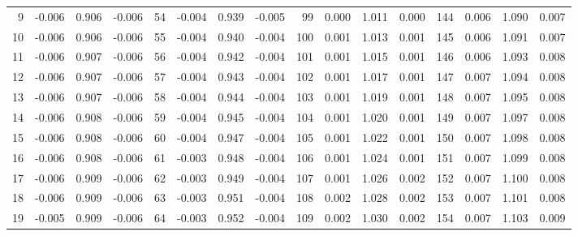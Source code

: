 \begin{table}
{\begin{tabular}{rrrr|rrrr|rrrr|crrr}
  9 & \tiny{ -0.006} &   0.906 & \tiny{ -0.006} &  54 & \tiny{ -0.004} &   0.939 & \tiny{ -0.005} &  99 & \tiny{  0.000} &   1.011 & \tiny{  0.000} & 144 & \tiny{  0.006} &   1.090 & \tiny{  0.007}\\
 10 & \tiny{ -0.006} &   0.906 & \tiny{ -0.006} &  55 & \tiny{ -0.004} &   0.940 & \tiny{ -0.004} & 100 & \tiny{  0.001} &   1.013 & \tiny{  0.001} & 145 & \tiny{  0.006} &   1.091 & \tiny{  0.007}\\
 11 & \tiny{ -0.006} &   0.907 & \tiny{ -0.006} &  56 & \tiny{ -0.004} &   0.942 & \tiny{ -0.004} & 101 & \tiny{  0.001} &   1.015 & \tiny{  0.001} & 146 & \tiny{  0.006} &   1.093 & \tiny{  0.008}\\
 12 & \tiny{ -0.006} &   0.907 & \tiny{ -0.006} &  57 & \tiny{ -0.004} &   0.943 & \tiny{ -0.004} & 102 & \tiny{  0.001} &   1.017 & \tiny{  0.001} & 147 & \tiny{  0.007} &   1.094 & \tiny{  0.008}\\
 13 & \tiny{ -0.006} &   0.907 & \tiny{ -0.006} &  58 & \tiny{ -0.004} &   0.944 & \tiny{ -0.004} & 103 & \tiny{  0.001} &   1.019 & \tiny{  0.001} & 148 & \tiny{  0.007} &   1.095 & \tiny{  0.008}\\
 14 & \tiny{ -0.006} &   0.908 & \tiny{ -0.006} &  59 & \tiny{ -0.004} &   0.945 & \tiny{ -0.004} & 104 & \tiny{  0.001} &   1.020 & \tiny{  0.001} & 149 & \tiny{  0.007} &   1.097 & \tiny{  0.008}\\
 15 & \tiny{ -0.006} &   0.908 & \tiny{ -0.006} &  60 & \tiny{ -0.004} &   0.947 & \tiny{ -0.004} & 105 & \tiny{  0.001} &   1.022 & \tiny{  0.001} & 150 & \tiny{  0.007} &   1.098 & \tiny{  0.008}\\
 16 & \tiny{ -0.006} &   0.908 & \tiny{ -0.006} &  61 & \tiny{ -0.003} &   0.948 & \tiny{ -0.004} & 106 & \tiny{  0.001} &   1.024 & \tiny{  0.001} & 151 & \tiny{  0.007} &   1.099 & \tiny{  0.008}\\
 17 & \tiny{ -0.006} &   0.909 & \tiny{ -0.006} &  62 & \tiny{ -0.003} &   0.949 & \tiny{ -0.004} & 107 & \tiny{  0.001} &   1.026 & \tiny{  0.002} & 152 & \tiny{  0.007} &   1.100 & \tiny{  0.008}\\
 18 & \tiny{ -0.006} &   0.909 & \tiny{ -0.006} &  63 & \tiny{ -0.003} &   0.951 & \tiny{ -0.004} & 108 & \tiny{  0.002} &   1.028 & \tiny{  0.002} & 153 & \tiny{  0.007} &   1.101 & \tiny{  0.008}\\
 19 & \tiny{ -0.005} &   0.909 & \tiny{ -0.006} &  64 & \tiny{ -0.003} &   0.952 & \tiny{ -0.004} & 109 & \tiny{  0.002} &   1.030 & \tiny{  0.002} & 154 & \tiny{  0.007} &   1.103 & \tiny{  0.009}\\

\end{tabular}}
\end{table}
